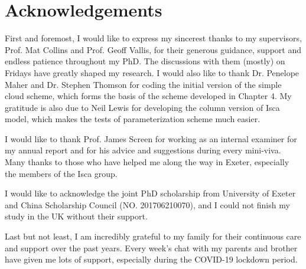 \makedeclaration

\newpage
\chapter*{Acknowledgements}
First and foremost, I would like to express my sincerest thanks to my supervisors, Prof. Mat Collins and Prof. Geoff Vallis, for their generous guidance, support and endless patience throughout my PhD. The discussions with them (mostly) on Fridays have greatly shaped my research. I would also like to thank Dr. Penelope Maher and Dr. Stephen Thomson for coding the initial version of the simple cloud scheme, which forms the basis of the scheme developed in Chapter 4. My gratitude is also due to Neil Lewis for developing the column version of Isca model, which makes the tests of parameterization scheme much easier.

I would like to thank Prof. James Screen for working as an internal examiner for my annual report and for his advice and suggestions during every mini-viva. Many thanks to those who have helped me along the way in Exeter, especially the members of the Isca group.


I would like to acknowledge the joint PhD scholarship from University of Exeter and China Scholarship Council (NO. 201706210070), and I could not finish my study in the UK without their support.

Last but not least, I am incredibly grateful to my family for their continuous care and support over the past years. Every week's chat with my parents and brother have given me lots of support, especially during the COVID-19 lockdown period.



